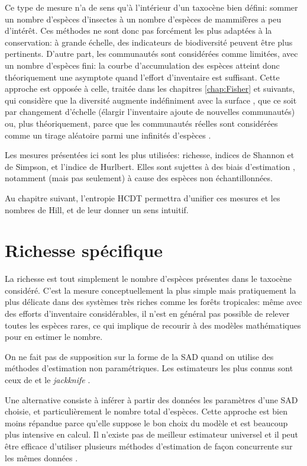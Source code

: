 \documentclass[
  11pt,
  french,
  a4paper,
  extrafontsizes,onecolumn,openright
  ]{memoir}
\begin{document}
Ce type de mesure n'a de sens qu'à l'intérieur d'un taxocène bien défini: sommer un nombre d'espèces d'insectes à un nombre d'espèces de mammifères a peu d'intérêt.
Ces méthodes ne sont donc pas forcément les plus adaptées à la conservation: à grande échelle, des indicateurs de biodiversité \autocite{Balmford2003} peuvent être plus pertinents.
D'autre part, les communautés sont considérées comme limitées, avec un nombre d'espèces fini: la courbe d'accumulation des espèces atteint donc théoriquement une asymptote quand l'effort d'inventaire est suffisant.
Cette approche est opposée à celle, traitée dans les chapitres \ref{chap:Fisher} et suivants, qui considère que la diversité augmente indéfiniment avec la surface \autocite{Williamson2001}, que ce soit par changement d'échelle (élargir l'inventaire ajoute de nouvelles communautés) ou, plus théoriquement, parce que les communautés réelles sont considérées comme un tirage aléatoire parmi une infinités d'espèces \autocite{Fisher1943}.

Les mesures présentées ici sont les plus utilisées: richesse, indices de Shannon et de Simpson, et l'indice de Hurlbert.
Elles sont sujettes à des biais d'estimation \autocite{Mouillot1999}, notamment (mais pas seulement) à cause des espèces non échantillonnées.

Au chapitre suivant, l'entropie HCDT permettra d'unifier ces mesures et les nombres de Hill, et de leur donner un sens intuitif.

\hypertarget{sec:Richesse}{%
\section{Richesse spécifique}\label{sec:Richesse}}

La richesse est tout simplement le nombre d'espèces présentes dans le taxocène considéré.
C'est la mesure conceptuellement la plus simple mais pratiquement la plus délicate dans des systèmes très riches comme les forêts tropicales: même avec des efforts d'inventaire considérables, il n'est en général pas possible de relever toutes les espèces rares, ce qui implique de recourir à des modèles mathématiques pour en estimer le nombre.

On ne fait pas de supposition sur la forme de la SAD quand on utilise des méthodes d'estimation non paramétriques.
Les estimateurs les plus connus sont ceux de \textcite{Chao1984} et le \emph{jackknife} \autocite{Burnham1979}.

Une alternative consiste à inférer à partir des données les paramètres d'une SAD choisie, et particulièrement le nombre total d'espèces.
Cette approche est bien moins répandue parce qu'elle suppose le bon choix du modèle et est beaucoup plus intensive en calcul.
Il n'existe pas de meilleur estimateur universel \autocite{OHara2005} et il peut être efficace d'utiliser plusieurs méthodes d'estimation de façon concurrente sur les mêmes données \autocite{Basset2012}.
\end{document}

